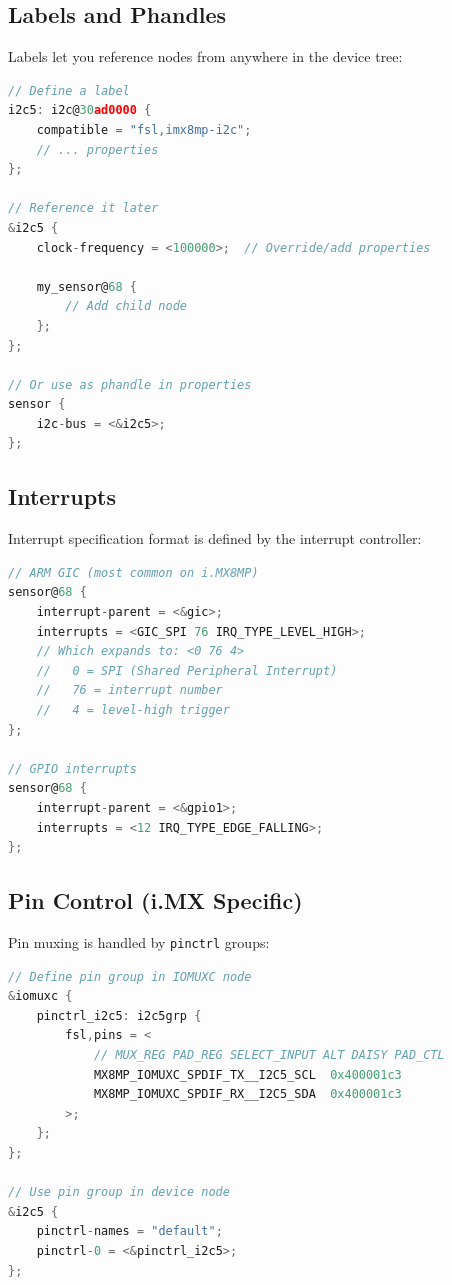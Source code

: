 \documentclass[12pt,a4paper]{report}
\begin{document}
\subsection{Labels and Phandles}

Labels let you reference nodes from anywhere in the device tree:

\begin{lstlisting}[language=c]
// Define a label
i2c5: i2c@30ad0000 {
    compatible = "fsl,imx8mp-i2c";
    // ... properties
};

// Reference it later
&i2c5 {
    clock-frequency = <100000>;  // Override/add properties
    
    my_sensor@68 {
        // Add child node
    };
};

// Or use as phandle in properties
sensor {
    i2c-bus = <&i2c5>;
};
\end{lstlisting}


\subsection{Interrupts}

Interrupt specification format is defined by the interrupt controller:

\begin{lstlisting}[language=c]
// ARM GIC (most common on i.MX8MP)
sensor@68 {
    interrupt-parent = <&gic>;
    interrupts = <GIC_SPI 76 IRQ_TYPE_LEVEL_HIGH>;
    // Which expands to: <0 76 4>
    //   0 = SPI (Shared Peripheral Interrupt)
    //   76 = interrupt number
    //   4 = level-high trigger
};

// GPIO interrupts
sensor@68 {
    interrupt-parent = <&gpio1>;
    interrupts = <12 IRQ_TYPE_EDGE_FALLING>;
};
\end{lstlisting}

\subsection{Pin Control (i.MX Specific)}

Pin muxing is handled by \texttt{pinctrl} groups:

\begin{lstlisting}[language=c]
// Define pin group in IOMUXC node
&iomuxc {
    pinctrl_i2c5: i2c5grp {
        fsl,pins = <
            // MUX_REG PAD_REG SELECT_INPUT ALT DAISY PAD_CTL
            MX8MP_IOMUXC_SPDIF_TX__I2C5_SCL  0x400001c3
            MX8MP_IOMUXC_SPDIF_RX__I2C5_SDA  0x400001c3
        >;
    };
};

// Use pin group in device node
&i2c5 {
    pinctrl-names = "default";
    pinctrl-0 = <&pinctrl_i2c5>;
};
\end{lstlisting}
\end{document}

